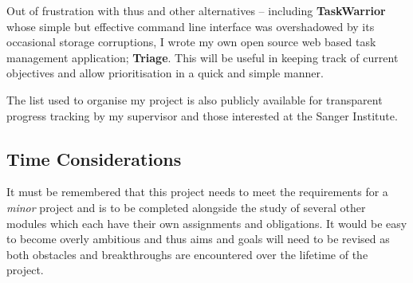 Out of frustration with thus and other alternatives -- including
\textbf{TaskWarrior} whose simple but effective command line interface was
overshadowed by its occasional storage corruptions, I wrote my own open source
web based task management application; \textbf{Triage}\citep{github:triage}.
This will be useful in keeping track of current objectives and allow
prioritisation in a quick and simple manner.

The list used to organise my project is also publicly available\citep{sam:triage}
for transparent progress tracking by my supervisor and those interested at the
Sanger Institute.


\subsection{Time Considerations}

It must be remembered that this project needs to meet the requirements for a
\textit{minor} project and is to be completed alongside the study of several
other modules which each have their own assignments and obligations. It would be
easy to become overly ambitious and thus aims and goals will need to be revised
as both obstacles and breakthroughs are encountered over the lifetime of the
project.

